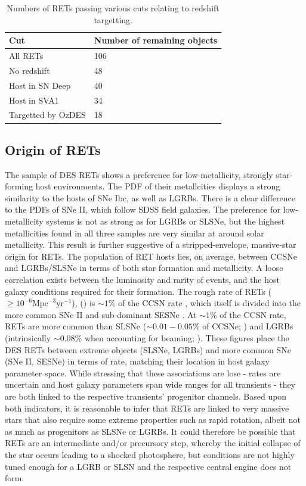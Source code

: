 \documentclass[fleqn,usenatbib,]{mnras}
\begin{document}
\begin{table}
    \centering
    \begin{tabular}{l|l}
         Cut &  Number of remaining objects \\
        \toprule
        All RETs & 106 \\
        No redshift   & 48\\
        Host in SN Deep & 40\\
        Host in SVA1 & 34 \\
        Targetted by OzDES & 18 \\
        \bottomrule
    \end{tabular}
    \caption{Numbers of RETs passing various cuts relating to redshift targetting.}
    \label{tab:z_cuts}
\end{table}

\subsection{Origin of RETs \label{subsec:disc_origin}}

The sample of DES RETs shows a preference for low-metallicity, strongly star-forming host environments. The PDF of their metallcities displays a strong similarity to the hosts of SNe Ibc, as well as LGRBs. There is a clear difference to the PDFs of SNe II, which follow SDSS field galaxies. The preference for low-metallicity systems is not as strong as for LGRBs or SLSNe, but the highest metallicities found in all three samples are very similar at around solar metallicity. This result is further suggestive of a stripped-envelope, massive-star origin for RETs. 
The population of RET hosts lies, on average, between CCSNe and LGRBs/SLSNe in terms of both star formation and metallicity. A loose correlation exists between the luminosity and rarity of events, and the host galaxy conditions required for their formation. The rough rate of RETs ($\geq 10^{-6} \mathrm{Mpc}^{-3} \mathrm{yr}^{-1}$), () is $\sim1\%$ of the CCSN rate \citep{Li2011,Horiuchi2011}, which itself is divided into the more common SNe II and sub-dominant SESNe \citep{Kelly2012,Frohmaier2020}. At $\sim1\%$ of the CCSN rate, RETs are more common than SLSNe ($\sim0.01 - 0.05\%$ of CCSNe; \citealt{McCrum2015,Prajz2016,Frohamier2020}) and LGRBs (intrinsically $\sim0.08\%$ when accounting for beaming; \citealt{Graham2016}). These figures place the DES RETs between extreme objects (SLSNe, LGRBs) and more common SNe (SNe II, SESNe) in terms of rate, matching their location in host galaxy parameter space. While stressing that these associations are lose - rates are uncertain and host galaxy parameters span wide ranges for all transients - they are both linked to the respective transients' progenitor channels. Based upon both indicators, it is reasonable to infer that RETs are linked to very massive stars that also require some extreme properties such as rapid rotation, albeit not as much as progenitors as SLSNe or LGRBs. It could therefore be possible that RETs are an intermediate and/or precursory step, whereby the initial collapse of the star occurs leading to a shocked photosphere, but conditions are not highly tuned enough for a LGRB or SLSN and the respective central engine does not form. 
\end{document}
